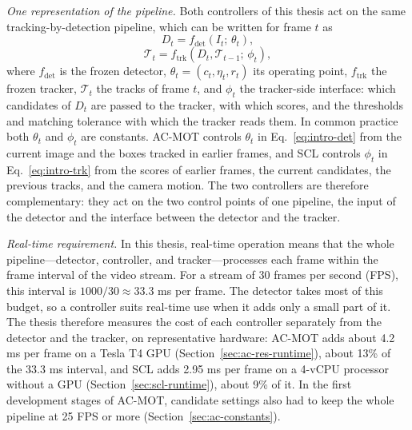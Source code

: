\emph{One representation of the pipeline.} Both controllers of this thesis act on the same tracking-by-detection pipeline, which can be written for frame $t$ as
\begin{equation}
D_t=f_{\mathrm{det}}\left(I_t;\,\theta_t\right),
\label{eq:intro-det}
\end{equation}
\begin{equation}
\mathcal{T}_t=f_{\mathrm{trk}}\left(D_t,\mathcal{T}_{t-1};\,\phi_t\right),
\label{eq:intro-trk}
\end{equation}
where $f_{\mathrm{det}}$ is the frozen detector, $\theta_t=(c_t,\eta_t,r_t)$ its operating point, $f_{\mathrm{trk}}$ the frozen tracker, $\mathcal{T}_t$ the tracks of frame $t$, and $\phi_t$ the tracker-side interface: which candidates of $D_t$ are passed to the tracker, with which scores, and the thresholds and matching tolerance with which the tracker reads them. In common practice both $\theta_t$ and $\phi_t$ are constants. AC-MOT controls $\theta_t$ in Eq.~\eqref{eq:intro-det} from the current image and the boxes tracked in earlier frames, and SCL controls $\phi_t$ in Eq.~\eqref{eq:intro-trk} from the scores of earlier frames, the current candidates, the previous tracks, and the camera motion. The two controllers are therefore complementary: they act on the two control points of one pipeline, the input of the detector and the interface between the detector and the tracker.

\emph{Real-time requirement.} In this thesis, real-time operation means that the whole pipeline---detector, controller, and tracker---processes each frame within the frame interval of the video stream. For a stream of 30 frames per second (FPS), this interval is $1000/30\approx33.3$ ms per frame. The detector takes most of this budget, so a controller suits real-time use when it adds only a small part of it. The thesis therefore measures the cost of each controller separately from the detector and the tracker, on representative hardware: AC-MOT adds about 4.2 ms per frame on a Tesla T4 GPU (Section~\ref{sec:ac-res-runtime}), about 13\% of the 33.3 ms interval, and SCL adds 2.95 ms per frame on a 4-vCPU processor without a GPU (Section~\ref{sec:scl-runtime}), about 9\% of it. In the first development stages of AC-MOT, candidate settings also had to keep the whole pipeline at 25 FPS or more (Section~\ref{sec:ac-constants}).

